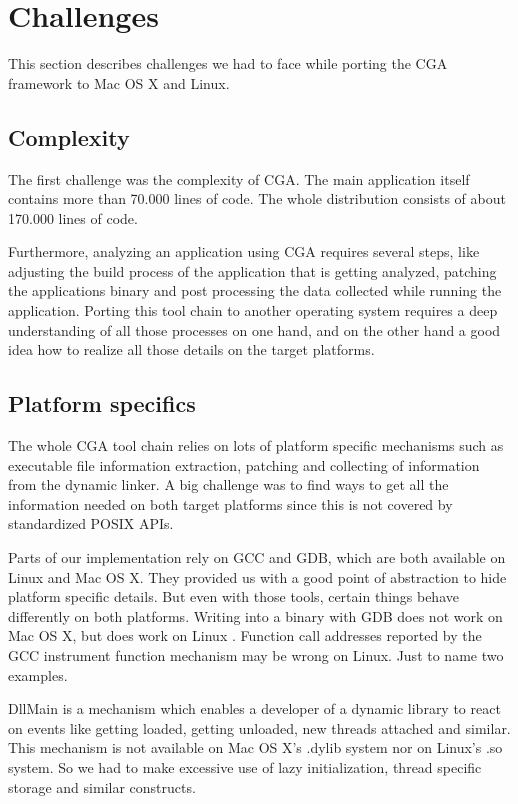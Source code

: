 
\section{Challenges} This section describes challenges we had to face while porting the CGA framework to Mac OS X and Linux.

\subsection{Complexity}

The first challenge was the complexity of CGA. The main application itself contains more than 70.000 lines of code. The whole distribution consists of about 170.000 lines of code.

Furthermore, analyzing an application using CGA requires several steps, like adjusting the build process of the application that is getting analyzed, patching the applications binary and post processing the data collected while running the application. Porting this tool chain to another operating system requires a deep understanding of all those processes on one hand, and on the other hand a good idea how to realize all those details on the target platforms.

\subsection{Platform specifics}

The whole CGA tool chain relies on lots of platform specific mechanisms such as executable file information extraction, patching and collecting of information from the dynamic linker. A big challenge was to find ways to get all the information needed on both target platforms since this is not covered by standardized POSIX APIs.

Parts of our implementation rely on GCC and GDB, which are both available on Linux and Mac OS X. They provided us with a good point of abstraction to hide platform specific details. But even with those tools, certain things behave differently on both platforms. Writing into a binary with GDB does not work on Mac OS X, but does work on Linux . Function call addresses reported by the GCC instrument function mechanism may be wrong on Linux.  Just to name two examples.

DllMain is a mechanism which enables a developer of a dynamic library to react on events like getting loaded, getting unloaded, new threads attached and similar. This mechanism is not available on Mac OS X's .dylib system nor on Linux's .so system.  So we had to make excessive use of lazy initialization, thread specific storage and similar constructs.

